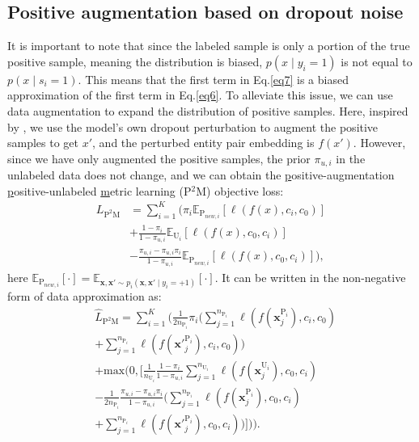 \documentclass[11pt]{article}
\begin{document}
\subsection{Positive augmentation based on dropout noise}

It is important to note that since the labeled sample is only a portion of the true positive sample, meaning the distribution is biased, $p(x \mid y_{i}=1)$ is not equal to $p(x \mid s_{i}=1)$. This means that the first term in Eq.\ref{eq7} is a biased approximation of the first term in Eq.\ref{eq6}. To alleviate this issue, we can use data augmentation to expand the distribution of positive samples. Here, inspired by \citep{gao-etal-2021-simcse}, we use the model's own dropout perturbation to augment the positive samples to get $x'$, and the perturbed entity pair embedding is $f(x')$. However, since we have only augmented the positive samples, the prior $\pi_{u,i}$ in the unlabeled data does not change, and we can obtain the \underline{p}ositive-augmentation \underline{p}ositive-unlabeled \underline{m}etric learning (P$^2$M) objective loss:
\begin{equation}
\begin{aligned}\label{eq8}
L_{\mathrm{P^{2}M}}&=\sum_{i=1}^{K}(\pi_{i} \mathbb{E}_{\mathrm{P}_{new,i}}[ \ell(f(x), c_{i}, c_{0})] \\
&+\frac{1-\pi_{i}}{1-\pi_{u,i}} \mathbb{E}_{\mathrm{U}_{i}}[\ell(f(x), c_{0}, c_{i})] \\
&-\frac{\pi_{u,i}-\pi_{u,i} \pi_{i}}{1-\pi_{u,i}}\mathbb{E}_{\mathrm{P}_{new,i}}[\ell(f(x), c_{0}, c_{i})]),
\end{aligned}
\end{equation}
here $\mathbb{E}_{\mathrm{P}_{new,i}}[\cdot]=\mathbb{E}_{\boldsymbol{x},\boldsymbol{x'} \sim p_{i}(\boldsymbol{x},\boldsymbol{x'} \mid y_{i}=+1)}[\cdot]$. It can be written in the non-negative form of data approximation as:
\begin{equation}
\begin{aligned}\label{eq9}
&\widehat{L}_{\mathrm{P^{2}M}}=\sum_{i=1}^{K}( \frac{1}{2n_{\mathrm{P}_{i}}}\pi_{i} (\sum_{j=1}^{n_{\mathrm{P}_{i}}}\ell(f(\boldsymbol{x}_{j}^{\mathrm{P}_{i}}), c_{i}, c_{0}) \\&+ \sum_{j=1}^{n_{\mathrm{P}_{i}}}\ell(f(\boldsymbol{x'}_{j}^{\mathrm{P}_{i}}), c_{i}, c_{0})) \\&+\mathrm{max}(0, [\frac{1}{n_{\mathrm{U}_{i}}} \frac{1-\pi_{i}}{1-\pi_{u,i}} \sum_{j=1}^{n_{\mathrm{U}_{i}}} \ell(f(\boldsymbol{x}_{j}^{\mathrm{U}_{i}}), c_{0}, c_{i})\\&-\frac{1}{2n_{\mathrm{P}_{i}}}\frac{\pi_{u,i}-\pi_{u,i} \pi_{i}}{1-\pi_{u,i}} (\sum_{j=1}^{n_{\mathrm{P}_{i}}}\ell(f(\boldsymbol{x}_{j}^{\mathrm{P}_{i}}), c_{0}, c_{i}) \\&+ \sum_{j=1}^{n_{\mathrm{P}_{i}}}\ell(f(\boldsymbol{x'}_{j}^{\mathrm{P}_{i}}), c_{0}, c_{i}))])).
\end{aligned}
\end{equation}
\end{document}
